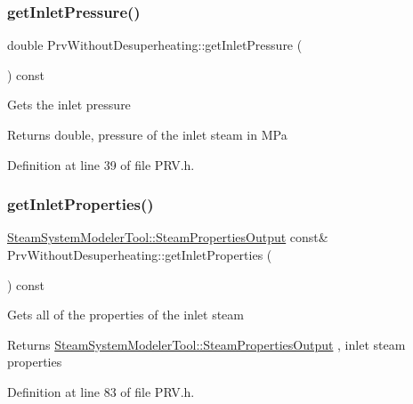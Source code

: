\subsubsection{\texorpdfstring{get\+Inlet\+Pressure()}{getInletPressure()}\hspace{0.1cm}{\footnotesize\ttfamily [3/3]}}
{\footnotesize\ttfamily double Prv\+Without\+Desuperheating\+::get\+Inlet\+Pressure (\begin{DoxyParamCaption}{ }\end{DoxyParamCaption}) const\hspace{0.3cm}{\ttfamily [inline]}}

Gets the inlet pressure

\begin{DoxyReturn}{Returns}
double, pressure of the inlet steam in M\+Pa 
\end{DoxyReturn}


Definition at line 39 of file P\+R\+V.\+h.

\mbox{\label{class_prv_without_desuperheating_aefb61f9d9dd99216459f6948308d11e9}} 
\subsubsection{\texorpdfstring{get\+Inlet\+Properties()}{getInletProperties()}\hspace{0.1cm}{\footnotesize\ttfamily [1/3]}}
{\footnotesize\ttfamily \hyperlink{struct_steam_system_modeler_tool_1_1_steam_properties_output}{Steam\+System\+Modeler\+Tool\+::\+Steam\+Properties\+Output} const\& Prv\+Without\+Desuperheating\+::get\+Inlet\+Properties (\begin{DoxyParamCaption}{ }\end{DoxyParamCaption}) const\hspace{0.3cm}{\ttfamily [inline]}}

Gets all of the properties of the inlet steam \begin{DoxyReturn}{Returns}
\hyperlink{struct_steam_system_modeler_tool_1_1_steam_properties_output}{Steam\+System\+Modeler\+Tool\+::\+Steam\+Properties\+Output} , inlet steam properties 
\end{DoxyReturn}


Definition at line 83 of file P\+R\+V.\+h.

